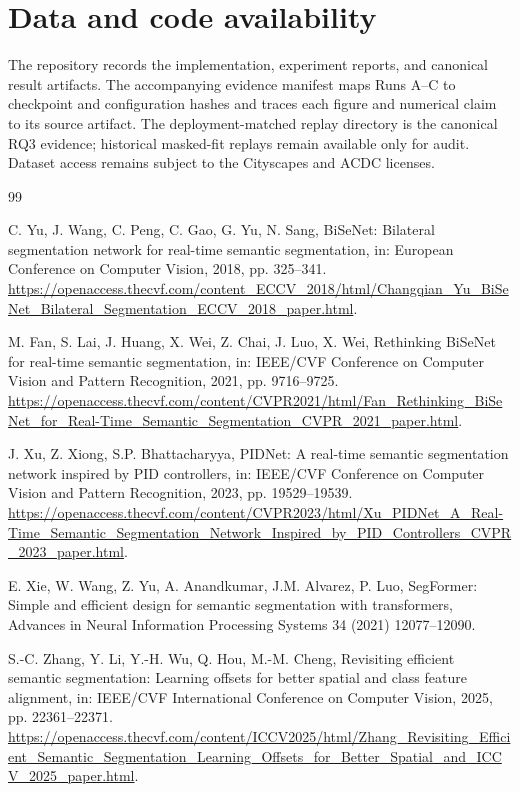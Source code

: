 \documentclass[a4paper,review,12pt]{elsarticle}
\begin{document}
\section*{Data and code availability}

The repository records the implementation, experiment reports, and canonical result artifacts. The accompanying evidence manifest maps Runs A--C to checkpoint and configuration hashes and traces each figure and numerical claim to its source artifact. The deployment-matched replay directory is the canonical RQ3 evidence; historical masked-fit replays remain available only for audit. Dataset access remains subject to the Cityscapes and ACDC licenses.

\begin{thebibliography}{99}

C. Yu, J. Wang, C. Peng, C. Gao, G. Yu, N. Sang,
BiSeNet: Bilateral segmentation network for real-time semantic segmentation,
in: European Conference on Computer Vision, 2018, pp. 325--341.
\url{https://openaccess.thecvf.com/content_ECCV_2018/html/Changqian_Yu_BiSeNet_Bilateral_Segmentation_ECCV_2018_paper.html}.

M. Fan, S. Lai, J. Huang, X. Wei, Z. Chai, J. Luo, X. Wei,
Rethinking BiSeNet for real-time semantic segmentation,
in: IEEE/CVF Conference on Computer Vision and Pattern Recognition, 2021, pp. 9716--9725.
\url{https://openaccess.thecvf.com/content/CVPR2021/html/Fan_Rethinking_BiSeNet_for_Real-Time_Semantic_Segmentation_CVPR_2021_paper.html}.

J. Xu, Z. Xiong, S.P. Bhattacharyya,
PIDNet: A real-time semantic segmentation network inspired by PID controllers,
in: IEEE/CVF Conference on Computer Vision and Pattern Recognition, 2023, pp. 19529--19539.
\url{https://openaccess.thecvf.com/content/CVPR2023/html/Xu_PIDNet_A_Real-Time_Semantic_Segmentation_Network_Inspired_by_PID_Controllers_CVPR_2023_paper.html}.

E. Xie, W. Wang, Z. Yu, A. Anandkumar, J.M. Alvarez, P. Luo,
SegFormer: Simple and efficient design for semantic segmentation with transformers,
Advances in Neural Information Processing Systems 34 (2021) 12077--12090.

S.-C. Zhang, Y. Li, Y.-H. Wu, Q. Hou, M.-M. Cheng,
Revisiting efficient semantic segmentation: Learning offsets for better spatial and class feature alignment,
in: IEEE/CVF International Conference on Computer Vision, 2025, pp. 22361--22371.
\url{https://openaccess.thecvf.com/content/ICCV2025/html/Zhang_Revisiting_Efficient_Semantic_Segmentation_Learning_Offsets_for_Better_Spatial_and_ICCV_2025_paper.html}.


\end{thebibliography}
\end{document}
